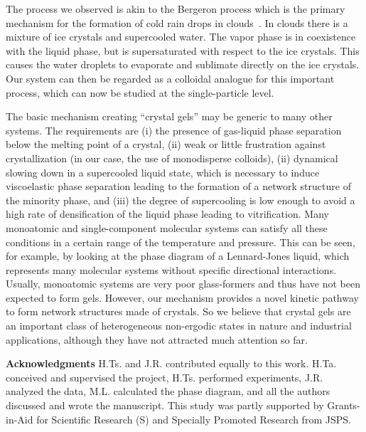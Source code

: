 \documentclass[12pt]{article}
\begin{document}
The process we observed is akin to the Bergeron process which is the primary mechanism for the formation of cold rain drops in clouds~\cite{glickman2000glossary}.
In clouds there is a mixture of ice crystals and supercooled water. The vapor phase is in coexistence with the liquid phase, but is supersaturated
with respect to the ice crystals. This causes the water droplets to evaporate and sublimate directly on the ice crystals. Our system can then
be regarded as a colloidal analogue for this important process, which can now be studied at the single-particle level. 

The basic mechanism creating ``crystal gels'' may be generic to many other
systems. The requirements are (i) the presence of gas-liquid phase separation below the melting point of a crystal, (ii) 
weak or little frustration against crystallization (in our case, the use of monodisperse colloids), 
(ii) dynamical slowing down in a supercooled liquid state, which is necessary to induce viscoelastic phase separation leading to the formation 
of a network structure of the minority phase, and (iii) the degree of supercooling is low enough to avoid a high rate of densification of the liquid phase 
leading to vitrification.   
Many monoatomic and single-component molecular systems can satisfy all these conditions in a certain range of the temperature and pressure. 
This can be seen, for example, by looking at the phase diagram of a Lennard-Jones liquid, which represents many molecular systems 
without specific directional interactions. 
Usually, monoatomic systems are very poor glass-formers and thus have not been expected to form gels. 
However, our mechanism provides a novel kinetic pathway to form network structures made of crystals.  
So we believe that crystal gels are an important class of heterogeneous non-ergodic states in nature 
and industrial applications, although they have not attracted much attention so far.  






\noindent
{\bf Acknowledgments}
\noindent
H.Ts. and J.R. contributed equally to this work. 
H.Ta. conceived and supervised the project, H.Ts. performed experiments, J.R. analyzed the data, M.L. calculated the phase diagram, and all the authors discussed and wrote the manuscript. 
This study was partly supported by Grants-in-Aid for Scientific Research (S) and Specially Promoted Research from JSPS.
\end{document}
